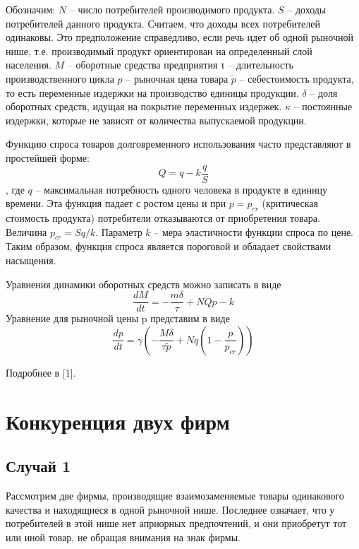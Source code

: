 \documentclass[
  12pt,
  a4paper,
]{scrreprt}
\begin{document}
Обозначим: \(N\) – число потребителей производимого продукта. \(S\) –
доходы потребителей данного продукта. Считаем, что доходы всех
потребителей одинаковы. Это предположение справедливо, если речь идет об
одной рыночной нише, т.е. производимый продукт ориентирован на
определенный слой населения. \(M\) – оборотные средства предприятия τ –
длительность производственного цикла \(p\) – рыночная цена товара
\(\tilde{p}\) – себестоимость продукта, то есть переменные издержки на
производство единицы продукции. \(\delta\) – доля оборотных средств,
идущая на покрытие переменных издержек. \(κ\) – постоянные издержки,
которые не зависят от количества выпускаемой продукции.

Функцию спроса товаров долговременного использования часто представляют
в простейшей форме: \[
Q = q - k\frac{q}{S}
\] , где \(q\) – максимальная потребность одного человека в продукте в
единицу времени. Эта функция падает с ростом цены и при \(p = p_{cr}\)
(критическая стоимость продукта) потребители отказываются от
приобретения товара. Величина \(p_{cr} = Sq/k\). Параметр \(k\) – мера
эластичности функции спроса по цене. Таким образом, функция спроса
является пороговой и обладает свойствами насыщения.

Уравнения динамики оборотных средств можно записать в виде \[
\frac{dM}{dt} = -\frac{m\delta}{\tau}+NQp-k
\] Уравнение для рыночной цены p представим в виде \[
\frac{dp}{dt} = \gamma(-\frac{M\delta}{\tau\tilde{p}} + Nq(1-\frac{p}{p_{cr}}))
\]

Подробнее в {[}1{]}.

\hypertarget{ux43aux43eux43dux43aux443ux440ux435ux43dux446ux438ux44f-ux434ux432ux443ux445-ux444ux438ux440ux43c}{%
\section{Конкуренция двух
фирм}\label{ux43aux43eux43dux43aux443ux440ux435ux43dux446ux438ux44f-ux434ux432ux443ux445-ux444ux438ux440ux43c}}

\hypertarget{ux441ux43bux443ux447ux430ux439-1}{%
\subsection{Случай 1}\label{ux441ux43bux443ux447ux430ux439-1}}

Рассмотрим две фирмы, производящие взаимозаменяемые товары одинакового
качества и находящиеся в одной рыночной нише. Последнее означает, что у
потребителей в этой нише нет априорных предпочтений, и они приобретут
тот или иной товар, не обращая внимания на знак фирмы.
\end{document}
